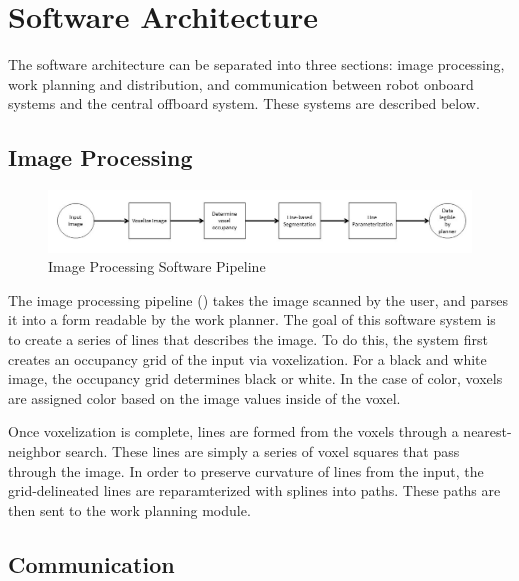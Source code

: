 
\pagebreak
\section{Software Architecture}
\label{sec:software_architecture}
The software architecture can be separated into three sections: image processing, work planning and distribution, and communication between robot onboard systems and the central offboard system. These systems are described below.

\subsection{Image Processing}
\label{sec:sw_arch_image_processing}

\begin{figure}[h!]
 \centering
  \includegraphics[width=0.99\columnwidth]{diagrams/sw_arch_image_processing.jpg}
	\caption{Image Processing Software Pipeline}
 \label{fig:image_processing}
\end{figure}

The image processing pipeline () takes the image scanned by the user, and parses it into a form readable by the work planner. The goal of this software system is to create a series of lines that describes the image. To do this, the system first creates an occupancy grid of the input via voxelization. For a black and white image, the occupancy grid determines black or white. In the case of color, voxels are assigned color based on the image values inside of the voxel.

Once voxelization is complete, lines are formed from the voxels through a nearest-neighbor search. These lines are simply a series of voxel squares that pass through the image. In order to preserve curvature of lines from the input, the grid-delineated lines are reparamterized with splines into paths. These paths are then sent to the work planning module.

\subsection{Communication}
\label{sec:sw_arch_communication}

